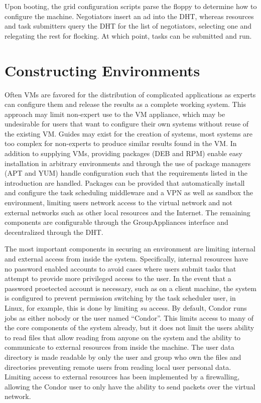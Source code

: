 Upon booting, the grid configuration scripts parse the floppy to determine how
to configure the machine.  Negotiators insert an ad into the DHT, whereas
resources and task submitters query the DHT for the list of negotiators,
selecting one and relegating the rest for flocking.  At which point, tasks
can be submitted and run.

\section{Constructing Environments}
Often VMs are favored for the distribution of complicated applications as
experts can configure them and release the results as a complete working system.
This approach may limit non-expert use to the VM appliance, which may be
undesirable for users that want to configure their own systems without reuse
of the existing VM.  Guides may exist for the creation of systems, most
systems are too complex for non-experts to produce similar results found in the
VM.  In addition to supplying VMs, providing packages (DEB and RPM) enable easy
installation in arbitrary environments and through the use of package
managers (APT and YUM) handle configuration such that the requirements listed
in the introduction are handled.  Packages can be provided that automatically
install and configure the task scheduling middleware and a VPN as well as
sandbox the environment, limiting users network access to the virtual network
and not external networks such as other local resources and the Internet.  The
remaining components are configurable through the GroupAppliances interface and
decentralized through the DHT.

The most important components in securing an environment are limiting internal
and external access from inside the system.  Specifically, internal resources
have no password enabled accounts to avoid cases where users submit tasks that
attempt to provide more privileged access to the user.  In the event that a
password proetected account is necessary, such as on a client machine, the system is
configured to prevent permission switching by the task scheduler user, in
Linux, for example, this is done by limiting \textit{su} access.  By default,
Condor runs jobs as either nobody or the user named ``Condor''.  This limits
access to many of the core components of the system already, but it does not
limit the users ability to read files that allow reading from anyone on the
system and the ability to communicate to external resources from inside the
machine.  The user data directory is made readable by only the user and group
who own the files and directories preventing remote users from reading local
user personal data.  Limiting access to external resources has been implemented
by a firewalling, allowing the Condor user to only have the ability to send
packets over the virtual network.

